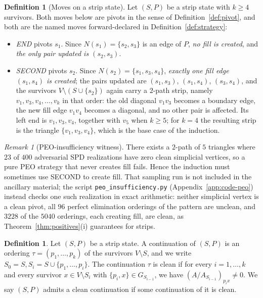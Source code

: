 \documentclass[11pt]{article}
\theoremstyle{plain}
\theoremstyle{definition}
\newtheorem{definition}[theorem]{Definition}
\theoremstyle{remark}
\newtheorem{remark}[theorem]{Remark}
\begin{document}
\begin{aiblock}
\begin{definition}[Moves on a strip state]\label{def:strip-moves}
Let $(S,P)$ be a strip state with $k\ge4$ survivors. Both moves below are pivots in the sense of
Definition~\ref{def:pivot}, and both are the named moves forward-declared in
Definition~\ref{def:strategy}:
\begin{itemize}
\item \emph{END} pivots $s_1$. Since $N(s_1)=\{s_2,s_3\}$ is an edge of $P$, \emph{no fill is created}, and \emph{the only pair updated is $(s_2,s_3)$}.
\item \emph{SECOND} pivots $s_2$. Since $N(s_2)=\{s_1,s_3,s_4\}$, \emph{exactly one fill edge $(s_1,s_4)$ is created}; the pairs updated are $(s_1,s_3)$, $(s_1,s_4)$, $(s_3,s_4)$, and the survivors $V\setminus(S\cup\{s_2\})$ again carry a $2$-path strip, namely $v_1,v_3,v_4,\dots,v_k$ in that order: the old diagonal $v_1v_3$ becomes a boundary edge, the new fill edge $v_1v_4$ becomes a diagonal, and no other pair is affected. Its left end is $v_1,v_3,v_4$, together with $v_5$ when $k\ge5$; for $k=4$ the resulting strip is the triangle $\{v_1,v_3,v_4\}$, which is the base case of the induction.
\end{itemize}
\end{definition}

\begin{remark}[PEO-insufficiency witness]\label{rem:peo-fail}
There exists a $2$-path of $5$ triangles where $23$ of $400$ adversarial SPD realizations have zero clean simplicial vertices, so a pure PEO strategy that never creates fill fails. Hence the induction must sometimes use SECOND to create fill. That sampling run is not included in the ancillary material; the script \texttt{peo\_insufficiency.py} (Appendix~\ref{app:code-peo}) instead checks one such realization in exact arithmetic: neither simplicial vertex is a clean pivot, all $96$ perfect elimination orderings of the pattern are unclean, and $3228$ of the $5040$ orderings, each creating fill, are clean, as Theorem~\ref{thm:positives}(i) guarantees for strips.
\end{remark}

\begin{definition}\label{def:clean_continuation}
    Let $(S, P)$ be a strip state. A continuation of $(S, P)$ is an ordering $\tau = (p_1,\dots, p_k)$ of the survivors $V\setminus S$, and we write $S_0 = S, S_i = S \cup \{p_1, \dots, p_i\}$. The continuation $\tau$ is clean if for every $i = 1, \dots, k$ and every survivor $x \in V\setminus S_i$ with $\{p_i, x\} \in G_{S_{i-1}}$, we have $(A / A_{S_{i-1}})_{p_i x} \neq 0$. We say $(S, P)$ admits a clean continuation if some continuation of it is clean.
\end{definition}


\end{aiblock}
\end{document}
